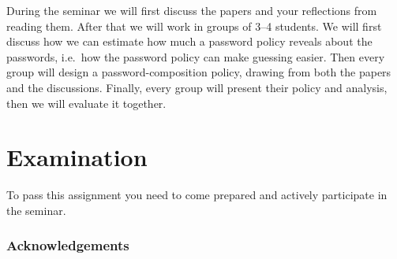 During the seminar we will first discuss the papers and your reflections from 
reading them.
After that we will work in groups of 3--4 students.
We will first discuss how we can estimate how much a password policy reveals 
about the passwords, i.e.\ how the password policy can make guessing easier.
Then every group will design a password-composition policy, drawing from both 
the papers and the discussions.
Finally, every group will present their policy and analysis, then we will 
evaluate it together.


\section{Examination}%
\label{sec:exam}

To pass this assignment you need to come prepared and actively participate in 
the seminar.


\subsubsection*{Acknowledgements}




\printbibliography{}
